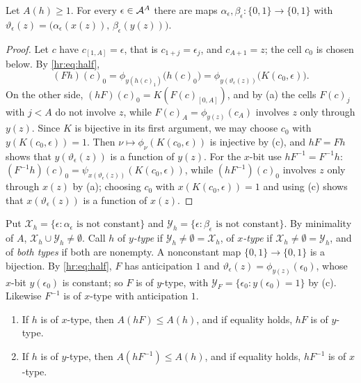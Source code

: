 \begin{lemma}\label{hr:lem:top}
Let $A(h)\ge1$. For every $\epsilon\in\mathcal{A}^A$ there are maps $\alpha_\epsilon,\beta_\epsilon\colon\{0,1\}\to\{0,1\}$ with $\vartheta_\epsilon(z)=\bigl(\alpha_\epsilon(x(z)),\,\beta_\epsilon(y(z))\bigr)$.
\end{lemma}

\begin{proof}
Let $c$ have $c_{[1,A]}=\epsilon$, that is $c_{1+j}=\epsilon_j$, and $c_{A+1}=z$; the cell $c_0$ is chosen below. By \eqref{hr:eq:half},
\[
(Fh)(c)_0=\phi_{y(h(c)_1)}\bigl(h(c)_0\bigr)=\phi_{y(\vartheta_\epsilon(z))}\bigl(K(c_0,\epsilon)\bigr).
\]
On the other side, $(hF)(c)_0=K(F(c)_{[0,A]})$, and by (a) the cells $F(c)_j$ with $j<A$ do not involve $z$, while $F(c)_A=\phi_{y(z)}(c_A)$ involves $z$ only through $y(z)$. Since $K$ is bijective in its first argument, we may choose $c_0$ with $y(K(c_0,\epsilon))=1$. Then $\nu\mapsto\phi_\nu(K(c_0,\epsilon))$ is injective by (c), and $hF=Fh$ shows that $y(\vartheta_\epsilon(z))$ is a function of $y(z)$. For the $x$-bit use $hF^{-1}=F^{-1}h$: $(F^{-1}h)(c)_0=\psi_{x(\vartheta_\epsilon(z))}(K(c_0,\epsilon))$, while $(hF^{-1})(c)_0$ involves $z$ only through $x(z)$ by (a); choosing $c_0$ with $x(K(c_0,\epsilon))=1$ and using (c) shows that $x(\vartheta_\epsilon(z))$ is a function of $x(z)$.
\end{proof}

Put $\mathcal X_h=\{\epsilon:\alpha_\epsilon\text{ is not constant}\}$ and $\mathcal Y_h=\{\epsilon:\beta_\epsilon\text{ is not constant}\}$. By minimality of $A$, $\mathcal X_h\cup\mathcal Y_h\ne\emptyset$. Call $h$ of \emph{$y$-type} if $\mathcal Y_h\ne\emptyset=\mathcal X_h$, of \emph{$x$-type} if $\mathcal X_h\ne\emptyset=\mathcal Y_h$, and of \emph{both types} if both are nonempty. A nonconstant map $\{0,1\}\to\{0,1\}$ is a bijection. By \eqref{hr:eq:half}, $F$ has anticipation $1$ and $\vartheta_\epsilon(z)=\phi_{y(z)}(\epsilon_0)$, whose $x$-bit $y(\epsilon_0)$ is constant; so $F$ is of $y$-type, with $\mathcal Y_F=\{\epsilon_0:y(\epsilon_0)=1\}$ by (c). Likewise $F^{-1}$ is of $x$-type with anticipation $1$.

\begin{lemma}\label{hr:lem:FF}
\begin{enumerate}
\item If $h$ is of $x$-type, then $A(hF)\le A(h)$, and if equality holds, $hF$ is of $y$-type.
\item If $h$ is of $y$-type, then $A(hF^{-1})\le A(h)$, and if equality holds, $hF^{-1}$ is of $x$-type.
\end{enumerate}
\end{lemma}

